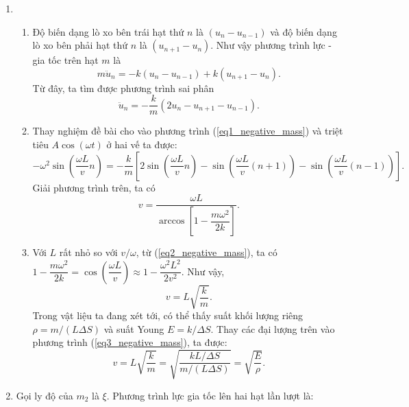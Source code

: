 \begin{enumerate}
\item 
\begin{enumerate}[label=\textbf{\alph*,}]\itemsep0em
    \item Độ biến dạng lò xo bên trái hạt thứ $n$ là $(u_n-u_{n-1})$ và độ biến dạng lò xo bên phải hạt thứ $n$ là $(u_{n+1}-u_n)$. Như vậy phương trình lực - gia tốc trên hạt $m$ là
    \begin{equation*}
        m \ddot{u}_n = - k (u_n-u_{n-1}) + k (u_{n+1}-u_n).
    \end{equation*}
    Từ đây, ta tìm được phương trình sai phân
    \begin{equation} \label{eq1_negative_mass}
        \ddot{u}_n = - \dfrac{k}{m} (2u_n-u_{n+1}-u_{n-1}).
    \end{equation}
    \item Thay nghiệm đề bài cho vào phương trình (\ref{eq1_negative_mass}) và triệt tiêu $A \cos (\omega t)$ ở hai vế ta được:
    \begin{equation*}
        -\omega^2 \sin \left( \dfrac{\omega L}{v} n \right) = -\dfrac{k}{m} \left[ 2 \sin \left( \dfrac{\omega L}{v} n \right) - \sin \left( \dfrac{\omega L}{v} (n+1) \right) - \sin \left( \dfrac{\omega L}{v} (n-1) \right) \right].
    \end{equation*}
    Giải phương trình trên, ta có
    \begin{equation} \label{eq2_negative_mass}
        v = \dfrac{\omega L}{ \arccos \left[ 1 - \dfrac{m\omega^2}{2k} \right]}.
    \end{equation}
    \item Với $L$ rất nhỏ so với $v/\omega$, từ (\ref{eq2_negative_mass}), ta có $1 - \dfrac{m\omega^2}{2k} = \cos \left( \dfrac{\omega L}{v} \right) \approx 1 - \dfrac{\omega^2 L^2}{2v^2}$. Như vậy, 
    \begin{equation} \label{eq3_negative_mass}
        v = L \sqrt{\dfrac{k}{m}}.
    \end{equation}
    Trong vật liệu ta đang xét tới, có thể thấy suất khối lượng riêng $\rho=m/(L \Delta S)$ và suất Young $E=k/\Delta S$. Thay các đại lượng trên vào phương trình (\ref{eq3_negative_mass}), ta được:
    \begin{equation} \label{eq4_negative_mass}
        v = L \sqrt{\dfrac{k}{m}} = \sqrt{\dfrac{k 
        L /\Delta S}{m/(L \Delta S)}} = \sqrt{\dfrac{E}{\rho}}.
    \end{equation}
\end{enumerate}
\item Gọi ly độ của $m_2$ là $\xi$. Phương trình lực gia tốc lên hai hạt lần lượt là:


\end{enumerate}

